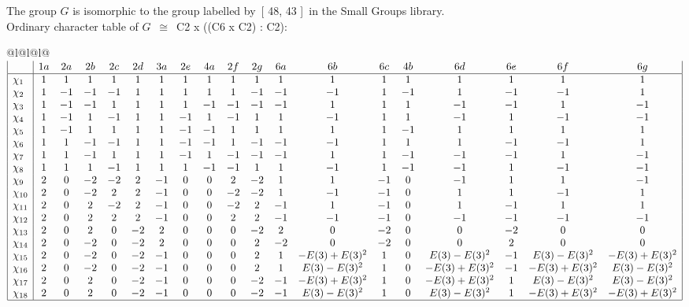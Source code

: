 \documentclass[varwidth=\maxdimen,border=10]{standalone}
\begin{document}
The group $G$ is isomorphic to the group labelled by\ [ 48, 43 ]\ in the Small Groups library.\\
Ordinary character table of $G$\ $\cong$\ C2 x ((C6 x C2) : C2):\\
\begin{center}
\begin{tabular}{@{}l@{}l@{}l@{}}
\hline
\(\begin{array}{|l|cccccccccccccccccc|}
  & 1a & 2a & 2b & 2c & 2d & 3a & 2e & 4a & 2f & 2g & 6a & 6b & 6c & 4b & 6d & 6e & 6f & 6g\\ \hline
\chi_{1} & 1 & 1 & 1 & 1 & 1 & 1 & 1 & 1 & 1 & 1 & 1 & 1 & 1 & 1 & 1 & 1 & 1 & 1\\
\chi_{2} & 1 & -1 & -1 & -1 & 1 & 1 & 1 & 1 & 1 & -1 & -1 & -1 & 1 & -1 & 1 & -1 & -1 & 1\\
\chi_{3} & 1 & -1 & -1 & 1 & 1 & 1 & 1 & -1 & -1 & -1 & -1 & 1 & 1 & 1 & -1 & -1 & 1 & -1\\
\chi_{4} & 1 & -1 & 1 & -1 & 1 & 1 & -1 & 1 & -1 & 1 & 1 & -1 & 1 & 1 & -1 & 1 & -1 & -1\\
\chi_{5} & 1 & -1 & 1 & 1 & 1 & 1 & -1 & -1 & 1 & 1 & 1 & 1 & 1 & -1 & 1 & 1 & 1 & 1\\
\chi_{6} & 1 & 1 & -1 & -1 & 1 & 1 & -1 & -1 & 1 & -1 & -1 & -1 & 1 & 1 & 1 & -1 & -1 & 1\\
\chi_{7} & 1 & 1 & -1 & 1 & 1 & 1 & -1 & 1 & -1 & -1 & -1 & 1 & 1 & -1 & -1 & -1 & 1 & -1\\
\chi_{8} & 1 & 1 & 1 & -1 & 1 & 1 & 1 & -1 & -1 & 1 & 1 & -1 & 1 & -1 & -1 & 1 & -1 & -1\\
\chi_{9} & 2 & 0 & -2 & -2 & 2 & -1 & 0 & 0 & 2 & -2 & 1 & 1 & -1 & 0 & -1 & 1 & 1 & -1\\
\chi_{10} & 2 & 0 & -2 & 2 & 2 & -1 & 0 & 0 & -2 & -2 & 1 & -1 & -1 & 0 & 1 & 1 & -1 & 1\\
\chi_{11} & 2 & 0 & 2 & -2 & 2 & -1 & 0 & 0 & -2 & 2 & -1 & 1 & -1 & 0 & 1 & -1 & 1 & 1\\
\chi_{12} & 2 & 0 & 2 & 2 & 2 & -1 & 0 & 0 & 2 & 2 & -1 & -1 & -1 & 0 & -1 & -1 & -1 & -1\\
\chi_{13} & 2 & 0 & 2 & 0 & -2 & 2 & 0 & 0 & 0 & -2 & 2 & 0 & -2 & 0 & 0 & -2 & 0 & 0\\
\chi_{14} & 2 & 0 & -2 & 0 & -2 & 2 & 0 & 0 & 0 & 2 & -2 & 0 & -2 & 0 & 0 & 2 & 0 & 0\\
\chi_{15} & 2 & 0 & -2 & 0 & -2 & -1 & 0 & 0 & 0 & 2 & 1 & -E(3)+E(3)^{2} & 1 & 0 & E(3)-E(3)^{2} & -1 & E(3)-E(3)^{2} & -E(3)+E(3)^{2}\\
\chi_{16} & 2 & 0 & -2 & 0 & -2 & -1 & 0 & 0 & 0 & 2 & 1 & E(3)-E(3)^{2} & 1 & 0 & -E(3)+E(3)^{2} & -1 & -E(3)+E(3)^{2} & E(3)-E(3)^{2}\\
\chi_{17} & 2 & 0 & 2 & 0 & -2 & -1 & 0 & 0 & 0 & -2 & -1 & -E(3)+E(3)^{2} & 1 & 0 & -E(3)+E(3)^{2} & 1 & E(3)-E(3)^{2} & E(3)-E(3)^{2}\\
\chi_{18} & 2 & 0 & 2 & 0 & -2 & -1 & 0 & 0 & 0 & -2 & -1 & E(3)-E(3)^{2} & 1 & 0 & E(3)-E(3)^{2} & 1 & -E(3)+E(3)^{2} & -E(3)+E(3)^{2}\\
\hline
\end{array}\)\\
\end{tabular}
\end{center}
\end{document}
